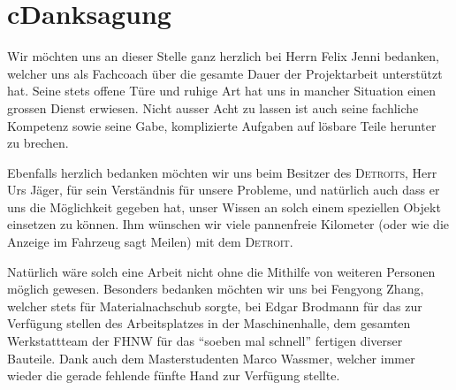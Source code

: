 \chapter*{c\quad Danksagung}
Wir möchten uns an dieser Stelle ganz herzlich bei Herrn Felix Jenni bedanken, welcher uns als Fachcoach über die gesamte Dauer der Projektarbeit unterstützt hat. Seine stets offene Türe und ruhige Art hat uns in mancher Situation einen grossen Dienst erwiesen. Nicht ausser Acht zu lassen ist auch seine fachliche Kompetenz sowie seine Gabe, komplizierte Aufgaben auf lösbare Teile herunter zu brechen.

Ebenfalls herzlich bedanken möchten wir uns beim Besitzer des \textsc{Detroits}, Herr Urs Jäger, für sein Verständnis für unsere Probleme, und natürlich auch dass er uns die Möglichkeit gegeben hat, unser Wissen an solch einem speziellen Objekt einsetzen zu können. Ihm wünschen wir viele pannenfreie Kilometer (oder wie die Anzeige im Fahrzeug sagt Meilen) mit dem \textsc{Detroit}.

Natürlich wäre solch eine Arbeit nicht ohne die Mithilfe von weiteren Personen möglich gewesen. Besonders bedanken möchten wir uns bei Fengyong Zhang, welcher stets für Materialnachschub sorgte, bei Edgar Brodmann für das zur Verfügung stellen des Arbeitsplatzes in der Maschinenhalle, dem gesamten Werkstattteam der FHNW für das "`soeben mal schnell"' fertigen diverser Bauteile. Dank auch dem Masterstudenten Marco Wassmer, welcher immer wieder die gerade fehlende fünfte Hand zur Verfügung stellte.

\color{black}